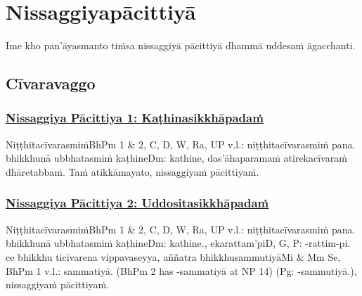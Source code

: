 
\section{Nissaggiyapācittiyā}
\label{np}

\begin{intro}
	Ime kho pan'āyasmanto tiṁsa nissaggiyā pācittiyā dhammā uddesaṁ āgacchanti.
\end{intro}

\setsubsecheadstyle{\subsectionFmt}
\subsection{Cīvaravaggo}

\subsubsection*{\hyperref[forf-exp1]{Nissaggiya Pācittiya 1: Kaṭhinasikkhāpadaṁ}}
\label{np1}

Niṭṭhitacīvarasmiṁ\makeatletter\hyperlink{endnote-appendix}\makeatother BhPm 1 & 2, C, D, W, Ra, UP v.l.: niṭṭhitacīvarasmiṁ pana. bhikkhunā ubbhatasmiṁ kaṭhine\makeatletter\hyperlink{endnote-appendix}\makeatother Dm: kathine, das'āhaparamaṁ atirekacīvaraṁ dhāretabbaṁ. Taṁ atikkāmayato, nissaggiyaṁ pācittiyaṁ.



\subsubsection*{\hyperref[forf-exp2]{Nissaggiya Pācittiya 2: Uddositasikkhāpadaṁ}}
\label{np2}

Niṭṭhitacīvarasmiṁ\makeatletter\hyperlink{endnote-appendix}\makeatother BhPm 1 & 2, C, D, W, Ra, UP v.l.: niṭṭhitacīvarasmiṁ pana. bhikkhunā ubbhatasmiṁ kaṭhine\makeatletter\hyperlink{endnote-appendix}\makeatother Dm: kathine., ekarattam'pi\makeatletter\hyperlink{endnote-appendix}\makeatother D, G, P: -rattim-pi.  ce bhikkhu ticīvarena vippavaseyya, aññatra bhikkhusammutiyā\makeatletter\hyperlink{endnote-appendix}\makeatother Mi & Mm Se, BhPm 1 v.l.: sammatiyā. (BhPm 2 has -sammatiyā at NP 14) (Pg: -sammutiyā.), nissaggiyaṁ pācittiyaṁ.




